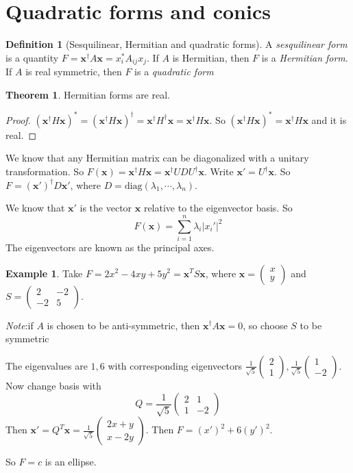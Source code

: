 \documentclass[a4paper]{article}
\theoremstyle{definition}
\newtheorem*{thm}{Theorem}
\newtheorem*{defi}{Definition}
\newtheorem*{eg}{Example}
\newcommand{\mb}[1]{\mathbf{#1}}
\newcommand{\note}{\noindent \emph{Note}:\;}
\let\stdsection\section
\renewcommand\section{\newpage\stdsection}
\begin{document}
\section{Quadratic forms and conics}
\begin{defi}[Sesquilinear, Hermitian and quadratic forms]
  A \emph{sesquilinear form} is a quantity $F = \mb{x}^\dagger A\mb{x} = x_i^*A_{ij}x_j$. If $A$ is Hermitian, then $F$ is a \emph{Hermitian form}. If $A$ is real symmetric, then $F$ is a \emph{quadratic form}
\end{defi}

\begin{thm}
  Hermitian forms are real.
\end{thm}
\begin{proof}
  $(\mb{x}^\dagger H\mb{x})^* = (\mb{x}^\dagger H\mb{x})^\dagger = \mb{x}^\dagger H^\dagger\mb{x} = \mb{x}^\dagger H\mb{x}$. So $(\mb{x}^\dagger H\mb{x})^* = \mb{x}^\dagger H\mb{x}$ and it is real.
\end{proof}

We know that any Hermitian matrix can be diagonalized with a unitary transformation. So $F(\mb{x}) = \mb{x}^\dagger H\mb{x} = \mb{x}^\dagger UDU^\dagger \mb{x}$. Write $\mb{x}' = U^\dagger \mb{x}$. So $F = (\mb{x}')^\dagger D\mb{x}'$, where $D = \mathrm{diag}(\lambda_1,\cdots,\lambda_n)$.

We know that $\mb{x}'$ is the vector $\mb{x}$ relative to the eigenvector basis. So 
\[
F(\mb{x}) = \sum_{i = 1}^n \lambda_i |x_i'|^2
\]
The eigenvectors are known as the principal axes.

\begin{eg}
  Take $F = 2x^2 - 4xy + 5y^2 = \mb{x}^TS\mb{x}$, where $\mb{x} = 
  \begin{pmatrix}
    x\\y
  \end{pmatrix}$ and $S = 
  \begin{pmatrix}
    2 & -2\\
    -2 & 5
  \end{pmatrix}$.

  \note if $A$ is chosen to be anti-symmetric, then $\mb{x}^\dagger A\mb{x} = 0$, so choose $S$ to be symmetric

  The eigenvalues are $1, 6$ with corresponding eigenvectors $
  \displaystyle \frac{1}{\sqrt{5}}\begin{pmatrix}
    2\\1
  \end{pmatrix},\frac{1}{\sqrt{5}}
  \begin{pmatrix}
    1\\-2
  \end{pmatrix}$. Now change basis with
  \[
  Q = \frac{1}{\sqrt{5}}
  \begin{pmatrix}
    2 & 1\\
    1 & -2
  \end{pmatrix}
  \]
  Then $\mb{x}' = Q^T\mb{x} =
  \frac{1}{\sqrt{5}}\begin{pmatrix}
    2x + y\\x - 2y
  \end{pmatrix}$. Then $F = (x')^2 + 6(y')^2$.

  So $F = c$ is an ellipse.
\end{eg}
\end{document}
